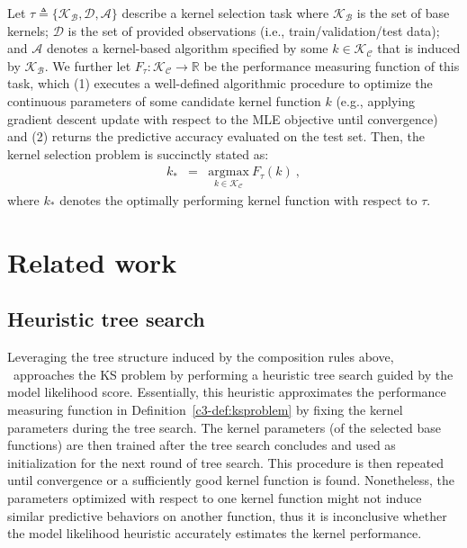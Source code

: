 \begin{definition}
\label{c3-def:ksproblem}
Let $\tau \triangleq \{\mathcal{K_B}, \mathcal{D}, \mathcal{A}\}$ describe a kernel selection task where $\mathcal{K_B}$ is the set of base kernels; $\mathcal{D}$ is the set of provided observations (i.e., train/validation/test data); and $\mathcal{A}$ denotes a kernel-based algorithm specified by some $k \in \mathcal{K_C}$ that is induced by $\mathcal{K_B}$. We further let $F_\tau: \mathcal{K_C} \rightarrow \mathbb{R}$ be the performance measuring function of this task, which (1) executes a well-defined algorithmic procedure to optimize the continuous parameters of some candidate kernel function $k$ (e.g., applying gradient descent update with respect to the MLE objective until convergence) and (2) returns the predictive accuracy evaluated on the test set. Then, the kernel selection problem is succinctly stated as:
\begin{eqnarray}
k_\ast &=& \underset{k \in \mathcal{K_C}}{\mathrm{argmax}} \  F_\tau(k) \ ,
\end{eqnarray}
where $k_\ast$ denotes the optimally performing kernel function with respect to $\tau$.
\end{definition}

\section{Related work}
\subsection{Heuristic tree search}
Leveraging the tree structure induced by the composition rules above, \citet{Duvenaud13}~approaches the KS problem by performing a heuristic tree search guided by the model likelihood score. Essentially, this heuristic approximates the performance measuring function in Definition~\ref{c3-def:ksproblem} by fixing the kernel parameters during the tree search. The kernel parameters (of the selected base functions) are then trained after the tree search concludes and used as initialization for the next round of tree search. This procedure is then repeated until convergence or a sufficiently good kernel function is found. Nonetheless, the parameters optimized with respect to one kernel function might not induce similar predictive behaviors on another function, thus it is inconclusive whether the model likelihood heuristic accurately estimates the kernel performance.

